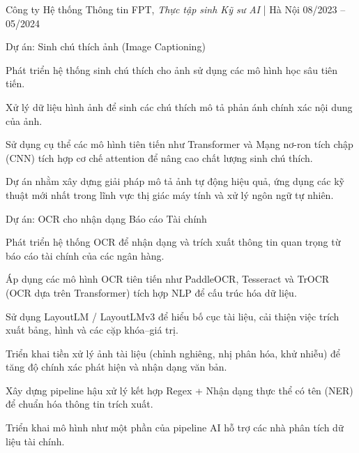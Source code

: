 \vspace{8pt}

\begin{cventries2}

  \cventrynew
  {Công ty Hệ thống Thông tin FPT, \textnormal{\textit{Thực tập sinh Kỹ sư AI} | Hà Nội}}
  {08/2023 -- 05/2024}
  {}

\end{cventries2}

\vspace{-10pt}

\begin{cventries}

  \cventry
    {Dự án: Sinh chú thích ảnh (Image Captioning)}
    {}
    {
      \begin{cvitems}
        \item {Phát triển hệ thống sinh chú thích cho ảnh sử dụng các mô hình học sâu tiên tiến.}
        \item {Xử lý dữ liệu hình ảnh để sinh các chú thích mô tả phản ánh chính xác nội dung của ảnh.}
        \item {Sử dụng cụ thể các mô hình tiên tiến như Transformer và Mạng nơ-ron tích chập (CNN) tích hợp cơ chế attention để nâng cao chất lượng sinh chú thích.}
        \item {Dự án nhằm xây dựng giải pháp mô tả ảnh tự động hiệu quả, ứng dụng các kỹ thuật mới nhất trong lĩnh vực thị giác máy tính và xử lý ngôn ngữ tự nhiên.}
      \end{cvitems}
    }

\vspace{8pt}

  \cventry
    {Dự án: OCR cho nhận dạng Báo cáo Tài chính}
    {}
    {
      \begin{cvitems}
        \item {Phát triển hệ thống OCR để nhận dạng và trích xuất thông tin quan trọng từ báo cáo tài chính của các ngân hàng.}
        \item {Áp dụng các mô hình OCR tiên tiến như PaddleOCR, Tesseract và TrOCR (OCR dựa trên Transformer) tích hợp NLP để cấu trúc hóa dữ liệu.}
        \item {Sử dụng LayoutLM / LayoutLMv3 để hiểu bố cục tài liệu, cải thiện việc trích xuất bảng, hình và các cặp khóa--giá trị.}
        \item {Triển khai tiền xử lý ảnh tài liệu (chỉnh nghiêng, nhị phân hóa, khử nhiễu) để tăng độ chính xác phát hiện và nhận dạng văn bản.}
        \item {Xây dựng pipeline hậu xử lý kết hợp Regex + Nhận dạng thực thể có tên (NER) để chuẩn hóa thông tin trích xuất.}
        \item {Triển khai mô hình như một phần của pipeline AI hỗ trợ các nhà phân tích dữ liệu tài chính.}
      \end{cvitems}
    }

\end{cventries}

